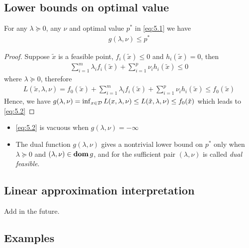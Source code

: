 \subsection{Lower bounds on optimal value}
For any $\lambda\succeq 0$, any $\nu$ and optimal value $p^\ast$ in \eqref{eq:5.1} we have
\begin{align}
  g(\lambda,\nu)\le p^\ast\label{eq:5.2}
\end{align}
\begin{proof}
  Suppose $\tilde{x}$ is a feasible point, \ie $f_i(\tilde{x})\le 0$ and $h_i(\tilde{x})=0$, then
  \begin{align*}
    \sum_{i=1}^m\lambda_if_i(\tilde{x})+\sum_{i=1}^p\nu_ih_i(\tilde{x})\le 0
  \end{align*}
  where $\lambda\succeq 0$, therefore
  \begin{align*}
    L(\tilde{x},\lambda,\nu)=f_0(\tilde{x})+\sum_{i=1}^m\lambda_if_i(\tilde{x})+\sum_{i=1}^p\nu_ih_i(\tilde{x})\le f_0(\tilde{x})
  \end{align*}
  Hence, we have $g(\lambda,\nu)=\inf_{x\in\mathcal{D}}L(x,\lambda,\nu)\le L(\tilde{x},\lambda,\nu)\le f_0(\tilde{x})$ which leads to \eqref{eq:5.2}
\end{proof}
\begin{itemize}
  \item \eqref{eq:5.2} is vacuous when $g(\lambda,\nu)=-\infty$
  \item The dual function $g(\lambda,\nu)$ gives a nontrivial lower bound on $p^\ast$ only when $\lambda\succeq 0$ and $(\lambda,\nu)\in\mathop{\bf dom} g$, and for the sufficient pair $(\lambda,\nu)$ is called \textit{dual feasible}.
\end{itemize}

\subsection{Linear approximation interpretation}
Add in the future.

\subsection{Examples}
